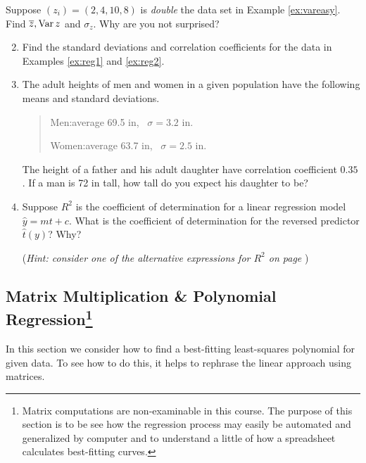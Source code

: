 \begin{exercises}{}{}
	\exstart Suppose $(z_i)=(2,4,10,8)$ is \emph{double} the data set in Example \ref{ex:vareasy}. Find $\overline{z},\operatorname{Var} z$ and $\sigma_z$. Why are you not surprised?
	
	\begin{enumerate}\setcounter{enumi}{1}
	  \item Find the standard deviations and correlation coefficients for the data in Examples \ref{ex:reg1} and \ref{ex:reg2}.
	  
	  
	  \item The adult heights of men and women in a given population have the following means and standard deviations.
	  \begin{quote}
	  	Men:\lstsp average 69.5 in, \ $\sigma=3.2$ in.\par
	  	Women:\lstsp average 63.7 in, \ $\sigma=2.5$ in.
	  \end{quote}
	  The height of a father and his adult daughter have correlation coefficient $0.35$. If a man is 72 in tall, how tall do you expect his daughter to be?
	
	  
	  \item Suppose $R^2$ is the coefficient of determination for a linear regression model $\hat y=mt+c$. What is the coefficient of determination for the reversed predictor $\hat t(y)$? Why?\par
	  (\emph{Hint: consider one of the alternative expressions for $R^2$ on page \pageref{pg:rsqalt}})
	\end{enumerate}

\end{exercises}

\clearpage



\subsection[Matrix Multiplication \& Polynomial Regression]{Matrix Multiplication \& Polynomial Regression\footnote{Matrix computations are non-examinable in this course. The purpose of this section is to be see how the regression process may easily be automated and generalized by computer and to understand a little of how a spreadsheet calculates best-fitting curves.}}

In this section we consider how to find a best-fitting least-squares polynomial for given data. To see how to do this, it helps to rephrase the linear approach using matrices.
\bigskip

